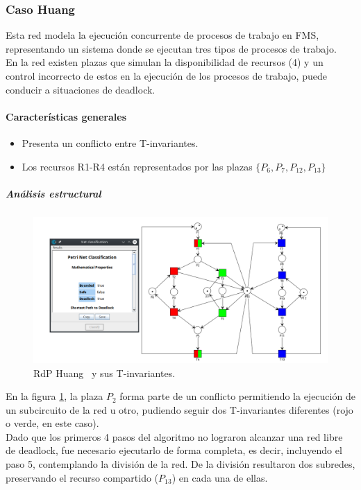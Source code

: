 \subsubsection{Caso Huang}
Esta red modela la ejecución concurrente de procesos de trabajo en FMS, representando un sistema donde se ejecutan tres tipos de procesos de trabajo.\\
En la red existen plazas que simulan la disponibilidad de recursos (4) y un control incorrecto de estos en la ejecución de los procesos de trabajo, puede conducir a situaciones de deadlock.\\

\paragraph{Características generales}
\begin{itemize}
    \item Presenta un conflicto entre T-invariantes. 
    \item Los recursos R1-R4 están representados por las plazas $\{P_6, P_7, P_{12}, P_{13}\}$
    \end{itemize}
\bigskip

\subparagraph{Análisis estructural}
\hfill
\begin{figure}[H]
	\centering
	\includegraphics[width=\textwidth]{Figures/algoritmo3/Huang1.png}
	\caption[RdP Huang y sus T-invariantes.]{RdP Huang \footnotemark \ y sus T-invariantes.}
	\label{fig:huang_T-invariantes}
 \end{figure} 
\bigskip

En la figura \ref{fig:huang_T-invariantes}, la plaza $P_2$ forma parte de un conflicto permitiendo la ejecución de un subcircuito de la red u otro, pudiendo seguir dos T-invariantes diferentes (rojo o verde, en este caso).\\
Dado que los primeros 4 pasos del algoritmo no lograron alcanzar una red libre de deadlock, fue necesario ejecutarlo de forma completa, es decir, incluyendo el paso 5, contemplando la división de la red.
De la división resultaron dos subredes, preservando el recurso compartido ($P_{13}$) en cada una de ellas.

